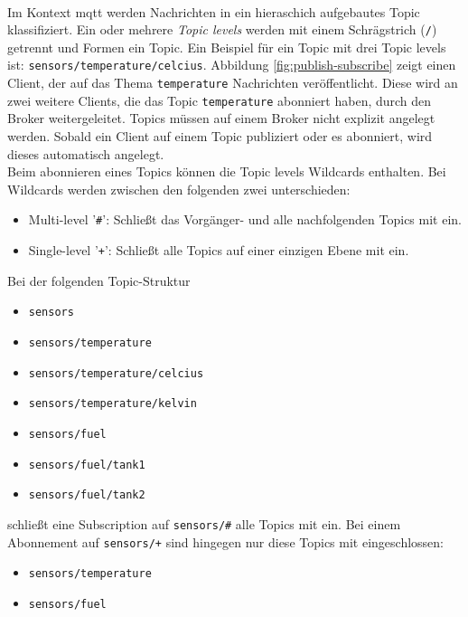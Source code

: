 \\
Im Kontext \ac{mqtt} werden Nachrichten in ein hieraschich aufgebautes Topic klassifiziert.
Ein oder mehrere \textit{Topic levels} werden mit einem Schrägstrich (\verb|/|) getrennt und Formen ein Topic. Ein Beispiel für ein Topic mit drei Topic levels ist: \verb|sensors/temperature/celcius|.
Abbildung \ref{fig:publish-subscribe} zeigt einen Client, der auf das Thema \verb|temperature| Nachrichten veröffentlicht. Diese wird an zwei weitere Clients, die das Topic \verb|temperature| abonniert haben, durch den Broker weitergeleitet. Topics müssen auf einem Broker nicht explizit angelegt werden. Sobald ein Client auf einem Topic publiziert oder es abonniert, wird dieses automatisch angelegt.\cite{WhatMQTTDefinition}\\
Beim abonnieren eines Topics können die Topic levels Wildcards enthalten. Bei Wildcards werden zwischen den folgenden zwei unterschieden:\cite{mqtt5Specification}
\begin{itemize}
    \item Multi-level '\verb|#|': Schlie{\ss}t das Vorgänger- und alle nachfolgenden Topics mit ein.
    \item Single-level '\verb|+|': Schlie{\ss}t alle Topics auf einer einzigen Ebene mit ein.
\end{itemize}
Bei der folgenden Topic-Struktur
\begin{itemize}
    \item \verb|sensors|
    \item \verb|sensors/temperature|
    \item \verb|sensors/temperature/celcius|
    \item \verb|sensors/temperature/kelvin|
    \item \verb|sensors/fuel|
    \item \verb|sensors/fuel/tank1|
    \item \verb|sensors/fuel/tank2|
\end{itemize}
schlie{\ss}t eine Subscription auf \verb|sensors/#| alle Topics mit ein. Bei einem Abonnement auf \verb|sensors/+| sind hingegen nur diese Topics mit eingeschlossen:
\begin{itemize}
    \item \verb|sensors/temperature|
    \item \verb|sensors/fuel|
\end{itemize}


